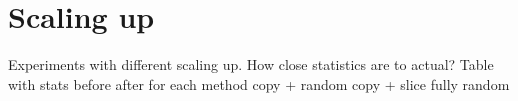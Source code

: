 \section{Scaling up}

Experiments with different scaling up. How close statistics are to actual?
Table with stats before after for each method
copy + random
copy + slice
fully random


